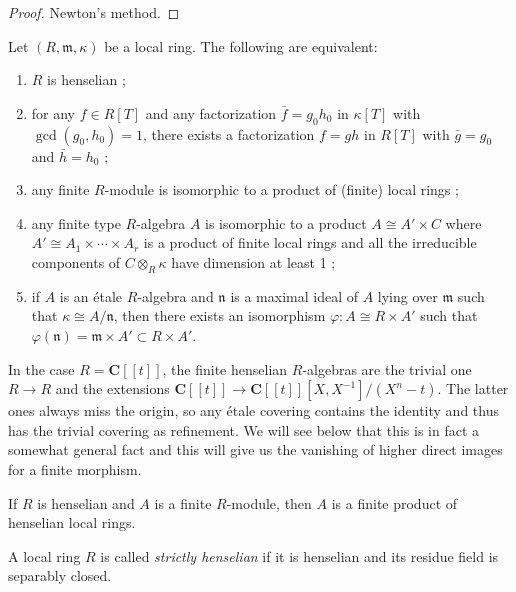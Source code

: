 \begin{proof}
Newton's method.
\end{proof}

\begin{theorem}
\label{theorem-henselian}
Let $(R, \mathfrak m, \kappa)$ be a local ring. The following are equivalent:
\begin{enumerate}
\item $R$ is henselian ;
\item for any $f\in R[T]$ and any factorization $\bar f = g_0 h_0$ in
$\kappa[T]$ with $\gcd(g_0,h_0)=1$, there exists a factorization $f=gh$ in
$R[T]$ with $\bar g = g_0$ and $\bar h=h_0$ ;
\item any finite $R$-module is isomorphic to a product of (finite) local rings ;
\item any finite type $R$-algebra $A$ is isomorphic to a product $A \cong A'
\times C$ where $A' \cong A_1 \times \cdots \times A_r$ is a product of finite
local rings and all the irreducible components of $C\otimes_R\kappa$ have
dimension at least 1 ;
\item if $A$ is an \'etale $R$-algebra and $\mathfrak n$ is a maximal ideal of
$A$ lying over $\mathfrak m$ such that $\kappa \cong A/\mathfrak n$, then there
exists an isomorphism $\varphi: A \cong R\times A'$ such that
$\varphi(\mathfrak n) = \mathfrak m \times A'\subset R\times A'$.
\end{enumerate}
\end{theorem}

\begin{example}
\label{example-powerseries}
In the case $R = \mathbf{C}[[t]]$, the finite henselian $R$-algebras are the
trivial one $R \to R$ and the extensions
$\mathbf{C}[[t]] \to \mathbf{C}[[t]][X, X^{-1}]/(X^n-t)$.
The latter ones always miss the origin, so any
\'etale covering contains the identity and thus has the trivial covering as
refinement. We will see below that this is in fact a somewhat general fact and
this will give us the vanishing of higher direct images for a finite morphism.
\end{example}

\begin{lemma}
\label{lemma-finite-over-henselian}
If $R$ is henselian and $A$ is a finite $R$-module, then $A$ is a finite
product of henselian local rings.
\end{lemma}

\begin{definition}
\label{definition-strictly-henselian}
A local ring $R$ is called {\it strictly henselian} if it is henselian and its
residue field is separably closed.
\end{definition}

